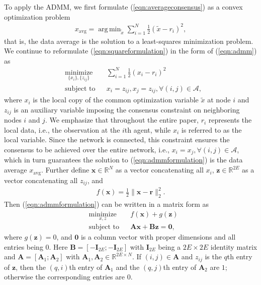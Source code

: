 \documentclass[journal]{IEEEtran}
\DeclareMathOperator*{\argmin}{arg\,min}
\begin{document}
To apply the ADMM, we first formulate (\ref{eqn:averageconsensus}) as a convex optimization problem
\begin{equation}
\label{eqn:squareformulation}
\begin{aligned}
x_\text{avg}=\argmin_{\tilde{x}}\sum_{i=1}^N\frac{1}{2}(\tilde{x}-r_i)^2,
\end{aligned}
\end{equation} 
that is, the data average is the solution to a least-squares minimization problem. We continue to reformulate (\ref{eqn:squareformulation}) in the form of (\ref{eqn:admm}) as
\begin{equation}
\begin{aligned}
\label{eqn:admmformulation}
& \underset{\{x_i\},\{z_{ij}\}}{\text{minimize}}
& & \sum_{i=1}^N \frac{1}{2}(x_i-r_i)^2\\
& \text{subject to}
& & x_i=z_{ij},x_j=z_{ij},\forall (i,j)\in\mathcal{A},
\end{aligned}
\end{equation}
where $x_i$ is the local copy of the common optimization variable $\tilde{x}$ at node $i$ and $z_{ij}$ is an auxiliary variable imposing the consensus constraint on neighboring nodes $i$ and $j$. We emphasize that throughout the entire paper, $r_i$ represents the local data, i.e., the observation at the $i$th agent, while $x_i$ is referred to as the local variable. Since the network is connected, this constraint ensures the consensus to be achieved over the entire network, i.e., $x_i=x_j, \forall (i,j) \in \mathcal{A}$, which in turn guarantees the solution to (\ref{eqn:admmformulation}) is the data average $x_\text{avg}$. Further define $\bm x\in\mathbb{R}^{N}$ as a vector concatenating all $x_i$, $\bm z\in\mathbb{R}^{2E}$ as a vector concatenating all $z_{ij}$, and 
\begin{align}
\label{eqn:objectivefunction}
f(\bm x)=\frac{1}{2}\|\bm x-\bm r\|_2^2.
\end{align}
Then (\ref{eqn:admmformulation}) can be written in a matrix form as 
\begin{equation}
\label{eqn:matrixform}
\begin{aligned}
& \underset{x,z}{\text{minimize}}
& & f(\bm x)+g(\bm z)\\
& \text{subject to}
& & \bm{Ax}+\bm{Bz}=\bm 0,
\end{aligned}
\end{equation}
where $g(\bm z)=0$, and $\bm 0$ is a column vector with proper dimensions and all entries being $0$. Here $\bm B = [-\bm I_{2E}; -\bm I_{2E}]$ with $\bm I_{2E}$ being a $2E\times 2E$ identity matrix and $\bm A = [\bm A_1;\bm A_2]$ with $\bm A_1,\bm A_2\in\mathbb{R}^{2E\times N}$. If $(i,j)\in\mathcal{\bm A}$ and $z_{ij}$ is the $q$th entry of $\bm z$, then the $(q,i)$th entry of $\bm A_1$ and the $(q,j)$th entry of $\bm A_2$ are $1$; otherwise the corresponding entries are $0$. 
\end{document}

